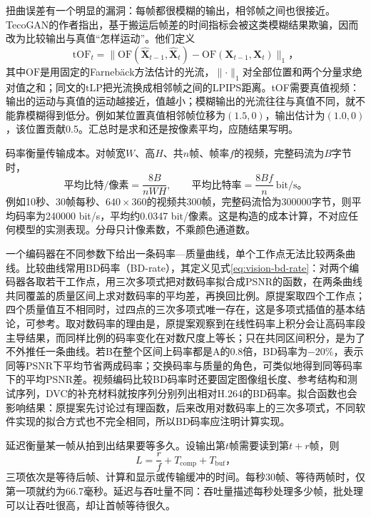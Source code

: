 扭曲误差有一个明显的漏洞：每帧都很模糊的输出，相邻帧之间也很接近。TecoGAN的作者指出，基于搬运后帧差的时间指标会被这类模糊结果欺骗，因而改为比较输出与真值“怎样运动”。他们定义
\begin{equation}
  \mathrm{tOF}_t=\bigl\lVert\mathrm{OF}(\widehat{\bm{X}}_{t-1},\widehat{\bm{X}}_t)
     -\mathrm{OF}(\bm{X}_{t-1},\bm{X}_t)\bigr\rVert_1\text{，}
  \label{eq:vision-video-tof}
\end{equation}
其中$\mathrm{OF}$是用固定的Farnebäck方法估计的光流，$\lVert\cdot\rVert_1$对全部位置和两个分量求绝对值之和；同文的$\mathrm{tLP}$把光流换成相邻帧之间的LPIPS距离。tOF需要真值视频：输出的运动与真值的运动越接近，值越小；模糊输出的光流往往与真值不同，就不能靠模糊得到低分。例如某位置真值相邻帧位移为$(1.5,0)$，输出估计为$(1.0,0)$，该位置贡献0.5。汇总时是求和还是按像素平均，应随结果写明。

码率衡量传输成本。对帧宽$W$、高$H$、共$n$帧、帧率$f$的视频，完整码流为$B$字节时，
\begin{equation}
  \text{平均比特/像素}=\frac{8B}{nWH},
  \qquad
  \text{平均比特率}=\frac{8Bf}{n}\ \mathrm{bit/s}\text{。}
  \label{eq:vision-video-bitrate}
\end{equation}
例如10秒、30帧每秒、$640\times360$的视频共300帧，完整码流恰为300000字节，则平均码率为240000 bit/s，平均约0.0347 bit/像素。这是构造的成本计算，不对应任何模型的实测表现。分母只计像素数，不乘颜色通道数。

一个编码器在不同参数下给出一条码率—质量曲线，单个工作点无法比较两条曲线。比较曲线常用BD码率（BD-rate），其定义见式\eqref{eq:vision-bd-rate}：对两个编码器各取若干工作点，用三次多项式把对数码率拟合成PSNR的函数，在两条曲线共同覆盖的质量区间上求对数码率的平均差，再换回比例。原提案取四个工作点；四个质量值互不相同时，过四点的三次多项式唯一存在，这是多项式插值的基本结论，可参考。取对数码率的理由是，原提案观察到在线性码率上积分会让高码率段主导结果，而同样比例的码率变化在对数尺度上等长；只在共同区间积分，是为了不外推任一条曲线。若B在整个区间上码率都是A的0.8倍，BD码率为$-20\%$，表示同等PSNR下平均节省两成码率；交换码率与质量的角色，可类似地得到同等码率下的平均PSNR差。视频编码比较BD码率时还要固定图像组长度、参考结构和测试序列，DVC的补充材料就按序列分别列出相对H.264的BD码率。拟合函数也会影响结果：原提案先讨论过有理函数，后来改用对数码率上的三次多项式，不同软件实现的拟合方式也不完全相同，所以BD码率应注明计算实现。

延迟衡量某一帧从拍到出结果要等多久。设输出第$t$帧需要读到第$t+r$帧，则
\begin{equation}
  L=\frac{r}{f}+T_{\mathrm{comp}}+T_{\mathrm{buf}}\text{，}
  \label{eq:vision-video-latency}
\end{equation}
三项依次是等待后帧、计算和显示或传输缓冲的时间。每秒30帧、等待两帧时，仅第一项就约为66.7毫秒。延迟与吞吐量不同：吞吐量描述每秒处理多少帧，批处理可以让吞吐很高，却让首帧等待很久。

